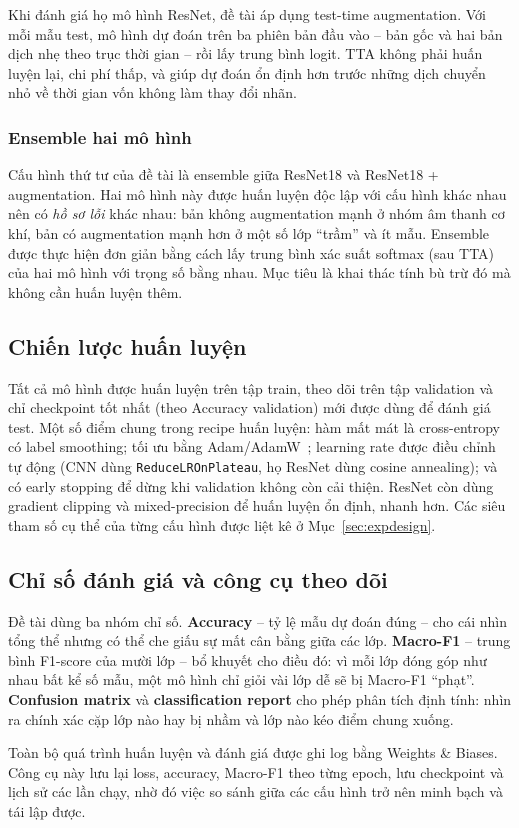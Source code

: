 Khi đánh giá họ mô hình ResNet, đề tài áp dụng test-time augmentation. Với mỗi
mẫu test, mô hình dự đoán trên ba phiên bản đầu vào -- bản gốc và hai bản dịch
nhẹ theo trục thời gian -- rồi lấy trung bình logit. TTA không phải huấn luyện
lại, chi phí thấp, và giúp dự đoán ổn định hơn trước những dịch chuyển nhỏ về
thời gian vốn không làm thay đổi nhãn.

\subsubsection{Ensemble hai mô hình}

Cấu hình thứ tư của đề tài là ensemble giữa ResNet18 và ResNet18 + augmentation.
Hai mô hình này được huấn luyện độc lập với cấu hình khác nhau nên có \textit{hồ
sơ lỗi} khác nhau: bản không augmentation mạnh ở nhóm âm thanh cơ khí, bản có
augmentation mạnh hơn ở một số lớp ``trầm'' và ít mẫu. Ensemble được thực hiện
đơn giản bằng cách lấy trung bình xác suất softmax (sau TTA) của hai mô hình với
trọng số bằng nhau. Mục tiêu là khai thác tính bù trừ đó mà không cần huấn luyện
thêm.

\subsection{Chiến lược huấn luyện}

Tất cả mô hình được huấn luyện trên tập train, theo dõi trên tập validation và
chỉ checkpoint tốt nhất (theo Accuracy validation) mới được dùng để đánh giá
test. Một số điểm chung trong recipe huấn luyện: hàm mất mát là cross-entropy có
label smoothing; tối ưu bằng Adam/AdamW~\cite{loshchilov2019}; learning rate được
điều chỉnh tự động (CNN dùng \texttt{ReduceLROnPlateau}, họ ResNet dùng cosine
annealing); và có early stopping để dừng khi validation không còn cải thiện.
ResNet còn dùng gradient clipping và mixed-precision để huấn luyện ổn định, nhanh
hơn. Các siêu tham số cụ thể của từng cấu hình được liệt kê ở
Mục~\ref{sec:expdesign}.

\subsection{Chỉ số đánh giá và công cụ theo dõi}

Đề tài dùng ba nhóm chỉ số. \textbf{Accuracy} -- tỷ lệ mẫu dự đoán đúng -- cho
cái nhìn tổng thể nhưng có thể che giấu sự mất cân bằng giữa các lớp.
\textbf{Macro-F1} -- trung bình F1-score của mười lớp -- bổ khuyết cho điều đó:
vì mỗi lớp đóng góp như nhau bất kể số mẫu, một mô hình chỉ giỏi vài lớp dễ sẽ bị
Macro-F1 ``phạt''. \textbf{Confusion matrix} và \textbf{classification report}
cho phép phân tích định tính: nhìn ra chính xác cặp lớp nào hay bị nhầm và lớp
nào kéo điểm chung xuống.

Toàn bộ quá trình huấn luyện và đánh giá được ghi log bằng Weights \& Biases. Công
cụ này lưu lại loss, accuracy, Macro-F1 theo từng epoch, lưu checkpoint và lịch
sử các lần chạy, nhờ đó việc so sánh giữa các cấu hình trở nên minh bạch và tái
lập được.
